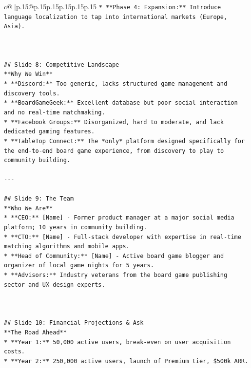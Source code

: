 \documentclass{article}
\begin{document}
{\begin{supertabular}{c@{$\;$}|p{.15\linewidth}@{}p{.15\linewidth}p{.15\linewidth}p{.15\linewidth}p{.15\linewidth}p{.15\linewidth}}
{{{\texttt{*   **Phase 4: Expansion:** Introduce language localization to tap into international markets (Europe, Asia).} \\
\\ 
\texttt{{-}{-}{-}} \\
\\ 
\texttt{\#\# Slide 8: Competitive Landscape} \\
\texttt{**Why We Win**} \\
\texttt{*   **Discord:** Too generic, lacks structured game management and discovery tools.} \\
\texttt{*   **BoardGameGeek:** Excellent database but poor social interaction and no real{-}time matchmaking.} \\
\texttt{*   **Facebook Groups:** Disorganized, hard to moderate, and lack dedicated gaming features.} \\
\texttt{*   **TableTop Connect:** The *only* platform designed specifically for the end{-}to{-}end board game experience, from discovery to play to community building.} \\
\\ 
\texttt{{-}{-}{-}} \\
\\ 
\texttt{\#\# Slide 9: The Team} \\
\texttt{**Who We Are**} \\
\texttt{*   **CEO:** {[}Name{]} {-} Former product manager at a major social media platform; 10 years in community building.} \\
\texttt{*   **CTO:** {[}Name{]} {-} Full{-}stack developer with expertise in real{-}time matching algorithms and mobile apps.} \\
\texttt{*   **Head of Community:** {[}Name{]} {-} Active board game blogger and organizer of local game nights for 5 years.} \\
\texttt{*   **Advisors:** Industry veterans from the board game publishing sector and UX design experts.} \\
\\ 
\texttt{{-}{-}{-}} \\
\\ 
\texttt{\#\# Slide 10: Financial Projections \& Ask} \\
\texttt{**The Road Ahead**} \\
\texttt{*   **Year 1:** 50,000 active users, break{-}even on user acquisition costs.} \\
\texttt{*   **Year 2:** 250,000 active users, launch of Premium tier, \$500k ARR.} \\
}}}
\end{supertabular}}
\end{document}
